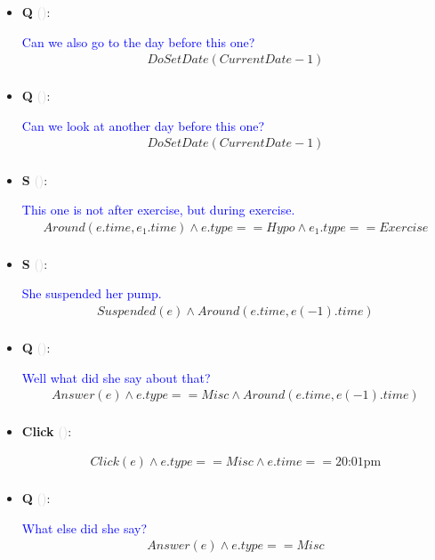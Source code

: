 \documentclass[11pt]{article}
\newcounter{CQ}
\newcounter{CS}
\newcounter{CClick}
\newcommand{\key}[1]{\textcolor{lightgray}{#1}}
\begin{document}
\begin{itemize}
	\item
	\textbf{Q\theCQ} \key{()}: \addtocounter{CQ}{1}
	\textcolor{blue}{ Can we also go to the day before this one? }
	\begin{multline*}
	DoSetDate(CurrentDate - 1) \\
	\end{multline*}
	

	\item
	\textbf{Q\theCQ} \key{()}: \addtocounter{CQ}{1}
	\textcolor{blue}{ Can we look at another day before this one? }
	\begin{multline*}
	DoSetDate(CurrentDate - 1) \\
	\end{multline*}
	

	\item
	\textbf{S\theCS} \key{()}: \addtocounter{CS}{1}
	\textcolor{blue}{ This one is not after exercise, but during exercise. }
	\begin{multline*}
	Around(e.time, e_1.time) \wedge e.type==Hypo \wedge e_1.type==Exercise \\
	\end{multline*}
	
	\item
	\textbf{S\theCS} \key{()}: \addtocounter{CS}{1}
	\textcolor{blue}{ She suspended her pump. }
	\begin{multline*}
	Suspended(e) \wedge Around(e.time, e(-1).time) \\
	\end{multline*}
	
	\item
	\textbf{Q\theCQ} \key{()}: \addtocounter{CQ}{1}
	\textcolor{blue}{ Well what did she say about that? }
	\begin{multline*}
	Answer(e) \wedge e.type == Misc \wedge Around(e.time, e(-1).time)\\
	\end{multline*}
	
	\item
	\textbf{Click\theCClick} \key{()}: \addtocounter{CClick}{1}
	\begin{multline*}
	Click(e) \wedge e.type == Misc \wedge e.time == \mbox{20:01pm} \\
	\end{multline*}
	
	\item
	\textbf{Q\theCQ} \key{()}: \addtocounter{CQ}{1}
	\textcolor{blue}{ What else did she say? }
	\begin{multline*}
	Answer(e) \wedge e.type == Misc \\
	\end{multline*}
	

\end{itemize}
\end{document}
